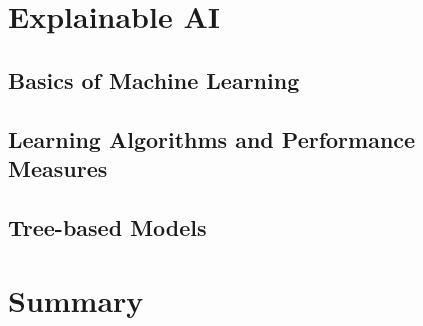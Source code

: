 \documentclass[11pt,a4paper, DIV=12]{report}
\begin{document}
    \section{Explainable AI}
    
    \label{background_explainable_ai}
        \subsection{Basics of Machine Learning}
            
        \subsection{Learning Algorithms and Performance Measures}
            \label{section_algorithms_performance_measures}
            
        \subsection{Tree-based Models}
            \label{section_tree_based_models}
            
    \section{Summary}
        
\end{document}
